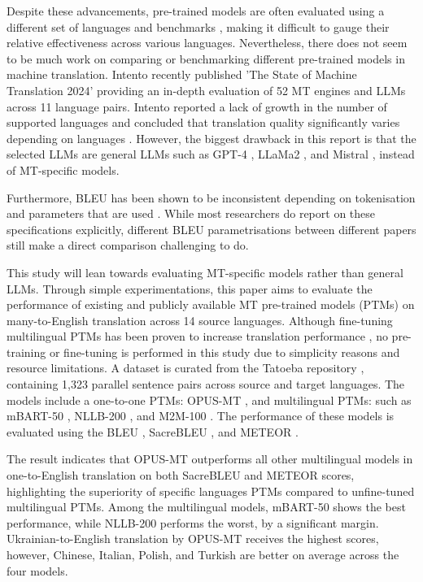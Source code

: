 \documentclass[a4paper, 11pt]{article}
\begin{document}
Despite these advancements, pre-trained models are often evaluated using a different set of languages and benchmarks \cite{liu-2020-mbart,nllb200-2020,fan-2020-m2m100,wei-2023-polylm}, making it difficult to gauge their relative effectiveness across various languages. Nevertheless, there does not seem to be much work on comparing or benchmarking different pre-trained models in machine translation. Intento recently published 'The State of Machine Translation 2024' \cite{intento-2020} providing an in-depth evaluation of 52 MT engines and LLMs across 11 language pairs. Intento reported a lack of growth in the number of supported languages and concluded that translation quality significantly varies depending on languages \cite{intento-2020}. However, the biggest drawback in this report is that the selected LLMs are general LLMs such as GPT-4 \cite{openai-2024-gpt4}, LLaMa2 \cite{touvron-2023-llama2}, and Mistral \cite{jiang-2023-mistral-7b}, instead of MT-specific models.

Furthermore, BLEU \cite{papieni-2002-bleu} has been shown to be inconsistent depending on tokenisation and parameters that are used \cite{post-2018-sacrebleu}. While most researchers do report on these specifications explicitly, different BLEU parametrisations between different papers still make a direct comparison challenging to do.

This study will lean towards evaluating MT-specific models rather than general LLMs. Through simple experimentations, this paper aims to evaluate the performance of existing and publicly available MT pre-trained models (PTMs) on many-to-English translation across 14 source languages. Although fine-tuning multilingual PTMs has been proven to increase translation performance \cite{cooper-stickland-2021-recipes}, no pre-training or fine-tuning is performed in this study due to simplicity reasons and resource limitations. A dataset is curated from the Tatoeba repository \cite{tatoeba}, containing 1,323 parallel sentence pairs across source and target languages. The models include a one-to-one PTMs: OPUS-MT \cite{tiedemann-2023-democratizing,tiedemann-2020-opus-mt}, and multilingual PTMs: such as mBART-50 \cite{liu-2020-mbart}, NLLB-200 \cite{nllb200-2020}, and M2M-100 \cite{fan-2020-m2m100}. The performance of these models is evaluated using the BLEU \cite{papieni-2002-bleu}, SacreBLEU \cite{post-2018-sacrebleu}, and METEOR \cite{lavie-2007-meteor}.

The result indicates that OPUS-MT outperforms all other multilingual models in one-to-English translation on both SacreBLEU and METEOR scores, highlighting the superiority of specific languages PTMs compared to unfine-tuned multilingual PTMs. Among the multilingual models, mBART-50 shows the best performance, while NLLB-200 performs the worst, by a significant margin. Ukrainian-to-English translation by OPUS-MT receives the highest scores, however, Chinese, Italian, Polish, and Turkish are better on average across the four models.
\end{document}
